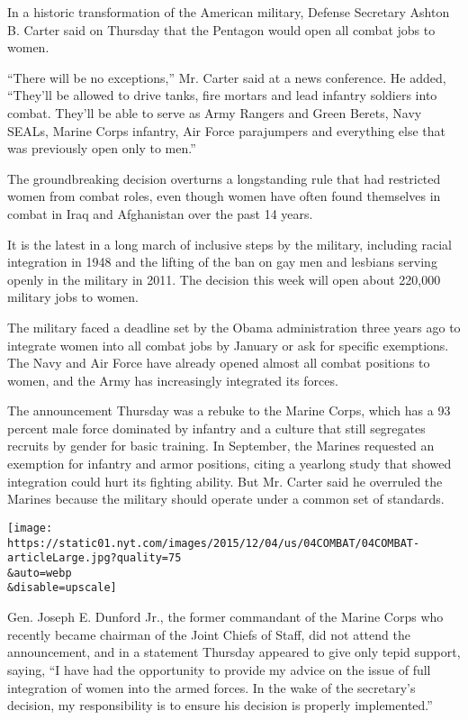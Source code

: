 In a historic transformation of the American military, Defense Secretary
Ashton B. Carter said on Thursday that the Pentagon would open all
combat jobs to women.

``There will be no exceptions,'' Mr. Carter said at a news conference.
He added, ``They'll be allowed to drive tanks, fire mortars and lead
infantry soldiers into combat. They'll be able to serve as Army Rangers
and Green Berets, Navy SEALs, Marine Corps infantry, Air Force
parajumpers and everything else that was previously open only to men.''

The groundbreaking decision overturns a longstanding rule that had
restricted women from combat roles, even though women have often found
themselves in combat in Iraq and Afghanistan over the past 14 years.

It is the latest in a long march of inclusive steps by the military,
including racial integration in 1948 and the lifting of the ban on gay
men and lesbians serving openly in the military in 2011. The decision
this week will open about 220,000 military jobs to women.

The military faced a deadline set by the Obama administration three
years ago to integrate women into all combat jobs by January or ask for
specific exemptions. The Navy and Air Force have already opened almost
all combat positions to women, and the Army has increasingly integrated
its forces.

The announcement Thursday was a rebuke to the Marine Corps, which has a
93 percent male force dominated by infantry and a culture that still
segregates recruits by gender for basic training. In September, the
Marines requested an exemption for infantry and armor positions, citing
a yearlong study that showed integration could hurt its fighting
ability. But Mr. Carter said he overruled the Marines because the
military should operate under a common set of standards.

\texttt{[image: https://static01.nyt.com/images/2015/12/04/us/04COMBAT/04COMBAT-articleLarge.jpg?quality=75\\\&auto=webp\\\&disable=upscale]}

Gen. Joseph E. Dunford Jr., the former commandant of the Marine Corps
who recently became chairman of the Joint Chiefs of Staff, did not
attend the announcement, and in a statement Thursday appeared to give
only tepid support, saying, ``I have had the opportunity to provide my
advice on the issue of full integration of women into the armed forces.
In the wake of the secretary's decision, my responsibility is to ensure
his decision is properly implemented.''


